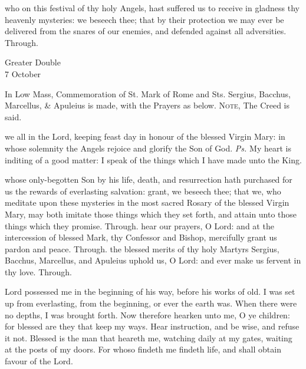 \vspace{-1ex}

\postcommunion
{} who on this festival of thy holy Angels, hast suffered us to receive in gladness thy heavenly mysteries: we beseech thee; that by their protection we may ever be delivered from the snares of our enemies, and defended against all adversities. Through.

\begin{inhead}
	{Greater Double\\
		7 October}
\end{inhead}
\begin{rubric}
	In Low Mass, Commemoration of St. Mark of Rome and Sts. Sergius, Bacchus, Marcellus, \& Apuleius is made, with the Prayers as below.
	\textsc{Note,} The Creed is said.
\end{rubric}

\introit
{} we all in the Lord, keeping feast day in honour of the blessed Virgin Mary: in whose solemnity the Angels rejoice and glorify the Son of God. \textit{Ps.} My heart is inditing of a good matter: I speak of the things which I have made unto the King.

\collect
{} whose only-begotten Son by his life, death, and resurrection hath purchased for us the rewards of everlasting salvation: grant, we beseech thee; that we, who meditate upon these mysteries in the most sacred Rosary of the blessed Virgin Mary, may both imitate those things which they set forth, and attain unto those things which they promise. Through.
 hear our prayers, O Lord: and at the intercession of blessed Mark, thy Confessor and Bishop, mercifully grant us pardon and peace. Through.
 the blessed merits of thy holy Martyrs Sergius, Bacchus, Marcellus, and Apuleius uphold us, O Lord: and ever make us fervent in thy love. Through.


 Lord possessed me in the beginning of his way, before his works of old. I was set up from everlasting, from the beginning, or ever the earth was. When there were no depths, I was brought forth. Now therefore hearken unto me, O ye children: for blessed are they that keep my ways. Hear instruction, and be wise, and refuse it not. Blessed is the man that heareth me, watching daily at my gates, waiting at the posts of my doors. For whoso findeth me findeth life, and shall obtain favour of the Lord.

